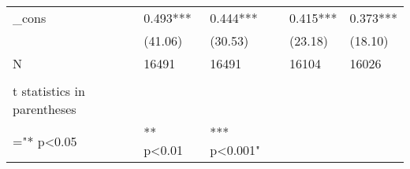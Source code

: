 \documentclass{article}
\begin{document}
\begin{table}[htbp]
\begin{tabular}{lllrr}
    \_cons & 0.493*** & 0.444*** & \multicolumn{1}{l}{0.415***} & \multicolumn{1}{l}{0.373***} \\
          & (41.06) & (30.53) & \multicolumn{1}{l}{(23.18)} & \multicolumn{1}{l}{(18.10)} \\
    N     & 16491 & 16491 & \multicolumn{1}{l}{16104} & \multicolumn{1}{l}{16026} \\
    \midrule
          &       &       &       &  \\
    t statistics in parentheses &       &       &       &  \\
    ="* p<0.05 &  ** p<0.01 &  *** p<0.001" &       &  \\
    \bottomrule
    \bottomrule
    \end{tabular}%
  \label{tab:addlabel}%
\end{table}%


\end{document}
